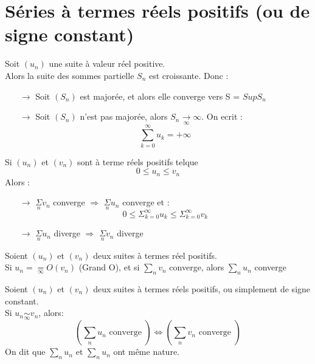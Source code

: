 \section{Séries à termes réels positifs (ou de signe constant)}
\begin{propfond}
Soit $(u_n)$ une suite à valeur réel positive.\\
Alors la suite des sommes partielle $S_n$ est croissante. Donc : 
\begin{itemize}
 \item[$\rightarrow$] Soit $(S_n)$ est majorée, et alors elle converge vers S = $Sup S_n$
 \item[$\rightarrow$] Soit $(S_n)$ n'est pas majorée, alors $S_n \underset{\infty}\rightarrow \infty$. On ecrit :
$$\sum_{k=0}^{\infty} u_k = +\infty$$
\end{itemize}
\end{propfond}
\begin{prop}
Si $(u_n) $ et $(v_n)$ sont à terme réels positifs telque 
$$0 \leq u_n \leq v_n$$
Alors : 
\begin{itemize}
 \item[$\rightarrow$] $\underset{n}\Sigma v_n$ converge $\Rightarrow$ $\underset{n}\Sigma u_n$ converge et :
$$0 \leq \Sigma_{k=0}^{\infty} u_k  \leq \Sigma_{k=0}^{\infty} v_k$$
 \item[$\rightarrow$] $\underset{n}\Sigma u_n$ diverge $\Rightarrow$ $\underset{n}\Sigma v_n$ diverge
\end{itemize}
\end{prop}
\begin{prop}
Soient $(u_n)$ et $(v_n)$ deux suites à termes réel positifs.\\
Si $u_n = \underset{\infty}= O(v_n)$ (Grand O), et si $\underset{n}\sum v_n$ converge, alors $\underset{n}\sum u_n$ converge
\end{prop}
\begin{prop}
Soient $(u_n)$ et $(v_n)$ deux suites à termes réels positifs, ou simplement de signe constant.\\
Si $u_n \underset{\infty}\sim v_n$, alors:
$$(\underset{n}\sum u_n \mbox{ converge })\Leftrightarrow(\underset{n}\sum v_n \mbox{ converge }) $$
On dit que $\underset{n}\sum u_n$ et $\underset{n}\sum u_n$ ont même nature.
\end{prop}
